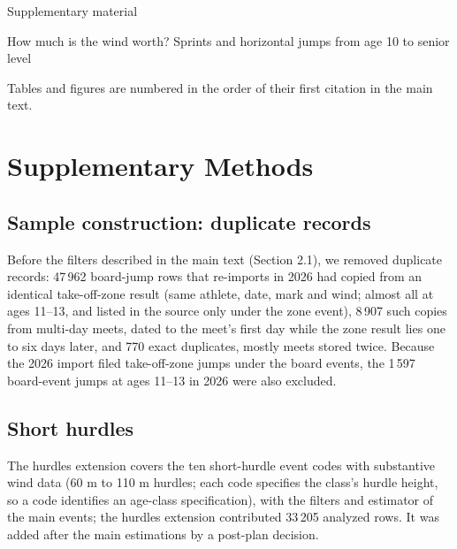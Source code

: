 \documentclass[12pt,a4paper]{article}
\begin{document}
{\noindent\Large\bfseries\raggedright{} Supplementary material\par}

\medskip
{\noindent\large\raggedright{} How much is the wind worth? Sprints and horizontal jumps from age 10 to senior level\par}

\medskip
\noindent Tables and figures are numbered in the order of their first citation in the main text.

\section*{Supplementary Methods}

\subsection*{Sample construction: duplicate records}

Before the filters described in the main text (Section 2.1), we removed duplicate records: 47\,962 board-jump rows that re-imports in 2026 had copied from an identical take-off-zone result (same athlete, date, mark and wind; almost all at ages 11--13, and listed in the source only under the zone event), 8\,907 such copies from multi-day meets, dated to the meet's first day while the zone result lies one to six days later, and 770 exact duplicates, mostly meets stored twice. Because the 2026 import filed take-off-zone jumps under the board events, the 1\,597 board-event jumps at ages 11--13 in 2026 were also excluded.

\subsection*{Short hurdles}

The hurdles extension covers the ten short-hurdle event codes with substantive wind data (60 m to 110 m hurdles; each code specifies the class's hurdle height, so a code identifies an age-class specification), with the filters and estimator of the main events; the hurdles extension contributed 33\,205 analyzed rows. It was added after the main estimations by a post-plan decision.
\end{document}
